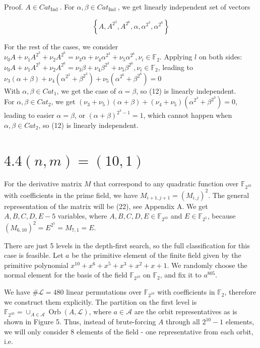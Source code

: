 \documentclass[10pt]{article}
\begin{document}
Proof. $A \in C a t_{\text {Ind }}$. For $\alpha, \beta \in C a t_{\text {Ind }}$, we get linearly independent set of vectors


\begin{equation*}
\left\{A, A^{2^{3}}, A^{2^{6}}, \alpha, \alpha^{2^{3}}, \alpha^{2^{6}}\right\} \tag{12}
\end{equation*}


For the rest of the cases, we consider $\nu_{0} A+\nu_{1} A^{2^{3}}+\nu_{2} A^{2^{6}}=\nu_{3} \alpha+\nu_{4} \alpha^{2^{3}}+\nu_{5} \alpha^{2^{6}}, \nu_{i} \in \mathbb{F}_{2}$. Applying $l$ on both sides: $\nu_{0} A+\nu_{1} A^{2^{3}}+\nu_{2} A^{2^{6}}=\nu_{3} \beta+\nu_{4} \beta^{2^{3}}+\nu_{5} \beta^{2^{6}}, \nu_{i} \in \mathbb{F}_{2}$, leading to $\nu_{3}(\alpha+\beta)+\nu_{4}\left(\alpha^{2^{3}}+\right. \left.\beta^{2^{3}}\right)+\nu_{5}\left(\alpha^{2^{6}}+\beta^{2^{6}}\right)=0$\\
With $\alpha, \beta \in C a t_{1}$, we get the case of $\alpha=\beta$, so (12) is linearly independent.\\
For $\alpha, \beta \in C a t_{2}$, we get $\left(\nu_{3}+\nu_{5}\right)(\alpha+\beta)+\left(\nu_{4}+\nu_{5}\right)\left(\alpha^{2^{3}}+\beta^{2^{3}}\right)=0$, leading to easier $\alpha=\beta$, or $(\alpha+\beta)^{2^{3}-1}=1$, which cannot happen when $\alpha, \beta \in C a t_{2}$, so (12) is linearly independent.

\section*{$4.4(n, m)=(10,1)$}
For the derivative matrix $M$ that correspond to any quadratic function over $\mathbb{F}_{2^{10}}$ with coefficients in the prime field, we have $M_{i+1, j+1}=\left(M_{i, j}\right)^{2}$. The general representation of the matrix will be (22), see Appendix A. We get $A, B, C, D, E-5$ variables, where $A, B, C, D, E \in \mathbb{F}_{2^{10}}$ and $E \in \mathbb{F}_{2^{5}}$, because $\left(M_{6,10}\right)^{2}=E^{2^{5}}=M_{7,1}=E$.

There are just 5 levels in the depth-first search, so the full classification for this case is feasible. Let $a$ be the primitive element of the finite field given by the primitive polynomial $x^{10}+x^{6}+x^{5}+ x^{3}+x^{2}+x+1$. We randomly choose the normal element for the basis of the field $\mathbb{F}_{2^{10}}$ on $\mathbb{F}_{2}$, and fix it to $a^{805}$.

We have $\# \mathcal{L}=480$ linear permutations over $\mathbb{F}_{2^{10}}$ with coefficients in $\mathbb{F}_{2}$, therefore we construct them explicitly. The partition on the first level is $\mathbb{F}_{2^{10}}=\cup_{A \in \mathcal{A}} \operatorname{Orb}(A, \mathcal{L})$, where $a \in \mathcal{A}$ are the orbit representatives as is shown in Figure 5. Thus, instead of brute-forcing $A$ through all $2^{10}-1$ elements, we will only consider 8 elements of the field - one representative from each orbit, i.e.
\end{document}
